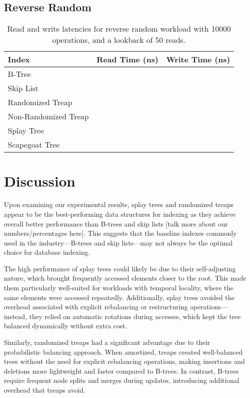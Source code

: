 \documentclass[sigconf]{acmart}
\begin{document}
\subsection{Reverse Random}
\begin{center}
  \begin{table}[H]
    \begin{tabular}{| l | c | c |}
      \hline
      \bf{Index} & \bf{Read Time (ns)} & \bf{Write Time (ns)} \\
      \hline
      B-Tree & & \\
      \hline
      Skip List & & \\
      \hline
      Randomized Treap & & \\
      \hline
      Non-Randomized Treap & & \\
      \hline
      Splay Tree & & \\
      \hline
      Scapegoat Tree & & \\
      \hline
    \end{tabular}
    \caption{Read and write latencies for reverse random workload with 10000 operations, and a lookback of 50 reads.}
  \end{table}
\end{center}

\section{Discussion}
Upon examining our experimental results, splay trees and randomized treaps appear to be the best-performing data structures for indexing as they achieve overall better performance than B-trees and skip lists [talk more about our numbers/percentages here]. This suggests that the baseline indexes commonly used in the industry---B-trees and skip lists---may not always be the optimal choice for database indexing.

The high performance of splay trees could likely be due to their self-adjusting nature, which brought frequently accessed elements closer to the root. This made them particularly well-suited for workloads with temporal locality, where the same elements were accessed repeatedly. Additionally, splay trees avoided the overhead associated with explicit rebalancing or restructuring operations---instead, they relied on automatic rotations during accesses, which kept the tree balanced dynamically without extra cost.

Similarly, randomized treaps had a significant advantage due to their probabilistic balancing approach. When amortized, treaps created well-balanced trees without the need for explicit rebalancing operations, making insertions and deletions more lightweight and faster compared to B-trees. In contrast, B-trees require frequent node splits and merges during updates, introducing additional overhead that treaps avoid.
\end{document}
